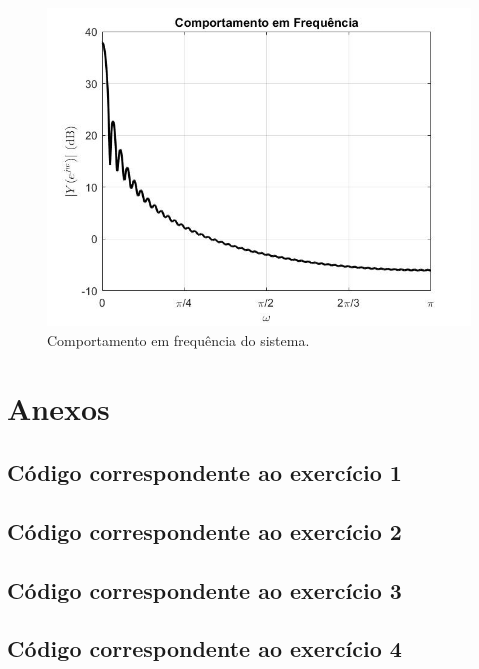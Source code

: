 \documentclass[a4paper,12pt,oneside,openany,table,xcdraw]{article}
\begin{document}
\begin{figure}[H]
\centering
\includegraphics[width=14cm]{ex5-comp-f}
\caption{Comportamento em frequência do sistema.}
\label{ex5:fig2}
\end{figure}

\newpage
\section{Anexos}
\subsection{Código correspondente ao exercício 1} \label{anexo:ex1}


\vspace{0.3cm}
\subsection{Código correspondente ao exercício 2} \label{anexo:ex2}


\vspace{0.3cm}
\subsection{Código correspondente ao exercício 3} \label{anexo:ex3}


\vspace{0.3cm}
\subsection{Código correspondente ao exercício 4} \label{anexo:ex4}

\end{document}
